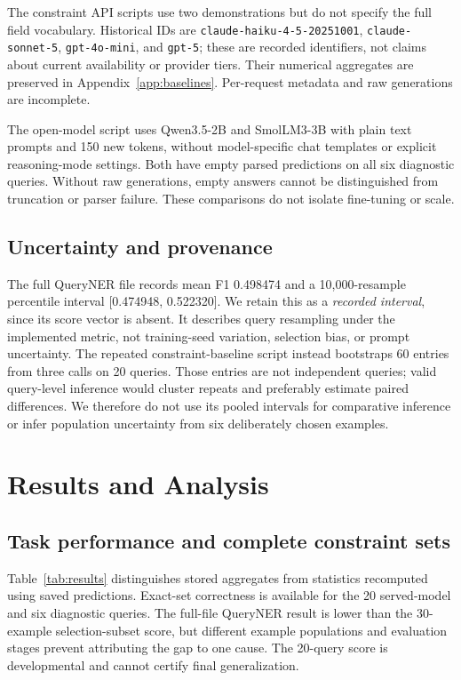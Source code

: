\documentclass{article}
\newcommand{\code}[1]{\texttt{#1}}
\begin{document}
The constraint API scripts use two demonstrations but do not specify the full field vocabulary. Historical IDs are \code{claude-haiku-4-5-20251001}, \code{claude-sonnet-5}, \code{gpt-4o-mini}, and \code{gpt-5}; these are recorded identifiers, not claims about current availability or provider tiers. Their numerical aggregates are preserved in Appendix~\ref{app:baselines}. Per-request metadata and raw generations are incomplete.

The open-model script uses Qwen3.5-2B and SmolLM3-3B with plain text prompts and 150 new tokens, without model-specific chat templates or explicit reasoning-mode settings. Both have empty parsed predictions on all six diagnostic queries. Without raw generations, empty answers cannot be distinguished from truncation or parser failure. These comparisons do not isolate fine-tuning or scale.

\subsection{Uncertainty and provenance}
The full QueryNER file records mean F1 0.498474 and a 10,000-resample percentile interval [0.474948, 0.522320]. We retain this as a \emph{recorded interval}, since its score vector is absent. It describes query resampling under the implemented metric, not training-seed variation, selection bias, or prompt uncertainty. The repeated constraint-baseline script instead bootstraps 60 entries from three calls on 20 queries. Those entries are not independent queries; valid query-level inference would cluster repeats and preferably estimate paired differences. We therefore do not use its pooled intervals for comparative inference or infer population uncertainty from six deliberately chosen examples.

\section{Results and Analysis}
\label{sec:results}
\subsection{Task performance and complete constraint sets}
Table~\ref{tab:results} distinguishes stored aggregates from statistics recomputed using saved predictions. Exact-set correctness is available for the 20 served-model and six diagnostic queries. The full-file QueryNER result is lower than the 30-example selection-subset score, but different example populations and evaluation stages prevent attributing the gap to one cause. The 20-query score is developmental and cannot certify final generalization.
\end{document}
